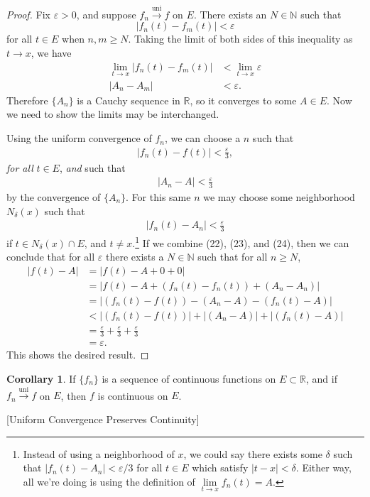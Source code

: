 \documentclass{article}
\newcommand{\N}{\mathbb{N}}
\newcommand{\R}{\mathbb{R}}
\newcommand{\uni}{\overset{\text{uni}}{\to}}
\theoremstyle{definition}
\newtheorem{corollary}{Corollary}[section]
\begin{document}
\begin{proof}
	Fix $ \varepsilon>0 $, and suppose $ f_n\uni f $ on $ E $. There exists an $ N\in\N $ such that $$ |f_n(t)-f_m(t)|<\varepsilon$$ for all $ t\in E $ when $ n,m\ge N $. Taking the limit of both sides of this inequality as $ t\to x $, we have \begin{align*}
\lim\limits_{t\to x}|f_n(t)-f_m(t)|&<\lim\limits_{t\to x}\varepsilon\\|A_n-A_m|&<\varepsilon.
	\end{align*}
	Therefore $ \{A_n\} $ is a Cauchy sequence in $ \R $, so it converges to some $ A\in E $. Now we need to show the limits may be interchanged.
	
	Using the uniform convergence of $ f_n $, we can choose a $ n $ such that \begin{align}
		|f_n(t)-f(t)|<\frac{\varepsilon}{3},
	\end{align}
	\textit{for all} $ t\in E $, \textit{and} such that \begin{align}
		|A_n-A|<\frac{\varepsilon}{3}
	\end{align}by the convergence of $ \{A_n\} $. For this same $ n $ we may choose some neighborhood $ N_\delta(x) $ such that\begin{align}
|f_n(t)-A_n|<\frac{\varepsilon}{3}
	\end{align}  if $ t\in N_\delta(x)\cap E $, and $ t\neq x $.\footnote{Instead of using a neighborhood of $ x $, we could say there exists some $ \delta $ such that $ |f_n(t)-A_n|<\varepsilon/3 $ for all $ t\in E $ which satisfy $ |t-x|<\delta $. Either way, all we're doing is using the definition of $ \lim\limits_{t\to x}f_n(t)=A $. } If we combine (22), (23), and (24), then we can conclude that for all $ \varepsilon $ there exists a $ N\in\N $ such that for all $ n\ge N $, \begin{align*}
	|f(t)-A|&=|f(t)-A+0+0|\\&=|f(t)-A+(f_n(t)-f_n(t))+(A_n-A_n)|\\&=|(f_n(t)-f(t))-(A_n-A)-(f_n(t)-A)|\\&<|(f_n(t)-f(t))|+|(A_n-A)|+|(f_n(t)-A)| \\&=\frac{\varepsilon}{3}+\frac{\varepsilon}{3}+\frac{\varepsilon}{3}\\&=\varepsilon.
	\end{align*}
	This shows the desired result.
\end{proof}
\begin{corollary}
	If $ \{f_n\} $ is a sequence of continuous functions on $ E\subset \R $, and if $ f_n\uni f $ on $ E $, then $ f $ is continuous on $ E $.
\end{corollary}[Uniform Convergence Preserves Continuity]
\end{document}

